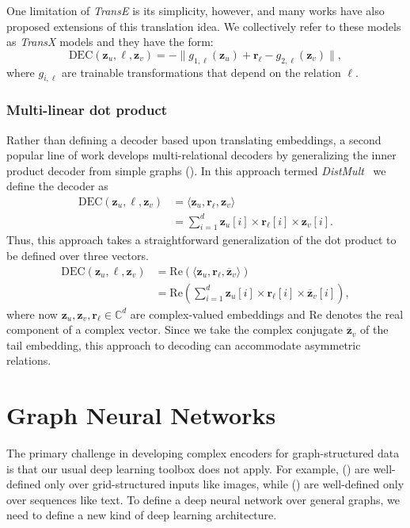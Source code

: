 One limitation of \textit{TransE} is its simplicity, however, and many works have also proposed extensions of this translation idea. We collectively refer to these models as \textit{TransX} models and they have the form:
\begin{equation*}
    \text{DEC}(\mathbf{z}_u, \ell, \mathbf{z}_v) = -\|g_{1,\ell}(\mathbf{z}_u) + \mathbf{r}_\ell - g_{2,\ell}(\mathbf{z}_v)\|,
\end{equation*}
where $g_{i,\ell}$ are trainable transformations that depend on the relation $\ell$.

\subsubsection{Multi-linear dot product}
Rather than defining a decoder based upon translating embeddings, a second popular line of work develops multi-relational decoders by generalizing the inner product decoder from simple graphs (). In this approach termed \textit{DistMult}~\cite{Yang2014DistMult} we define the decoder as
\begin{align*}
    \text{DEC}(\mathbf{z}_u, \ell, \mathbf{z}_v) &= \langle\mathbf{z}_u, \mathbf{r}_\ell, \mathbf{z}_v\rangle\\
    &= \sum_{i=1}^d \mathbf{z}_u[i] \times \mathbf{r}_\ell[i] \times \mathbf{z}_v[i].
\end{align*}
Thus, this approach takes a straightforward generalization of the dot product to be defined over three vectors.
\begin{align*}
\text{DEC}(\mathbf{z}_u, \ell, \mathbf{z}_v) &= \text{Re}(\langle \mathbf{z}_u, \mathbf{r}_\ell, \overline{\mathbf{z}}_v\rangle)\\
&= \text{Re}(\sum_{i=1}^d \mathbf{z}_u[i] \times \mathbf{r}_\ell[i] \times \overline{\mathbf{z}}_v[i]),
\end{align*}
where now $\mathbf{z}_u, \mathbf{z}_v, \mathbf{r}_\ell \in \mathbb{C}^d$ are complex-valued embeddings and $\text{Re}$ denotes the real component of a complex vector. Since we take the complex conjugate $\overline{\mathbf{z}}_v$ of the tail embedding, this approach to decoding can accommodate asymmetric relations.

\section{Graph Neural Networks}\label{sec:gnn}
The primary challenge in developing complex encoders for graph-structured data is that our usual deep learning toolbox does not apply. For example,  () are well-defined only over grid-structured inputs like images, while  () are well-defined only over sequences like text. To define a deep neural network over general graphs, we need to define a new kind of deep learning architecture.


